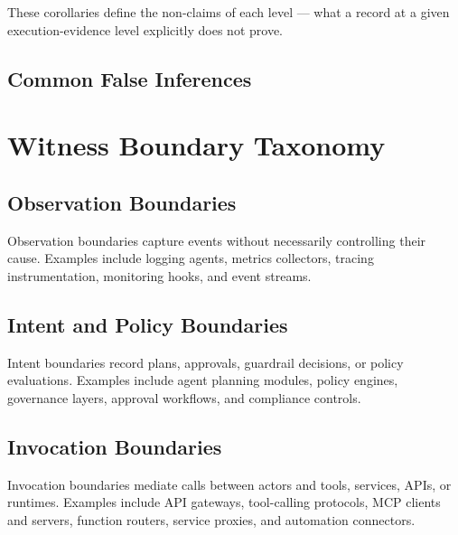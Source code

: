 \documentclass[11pt]{article}
\begin{document}
\medskip
\noindent These corollaries define the non-claims of each level --- what a record at a given execution-evidence level explicitly does not prove.

\subsection{Common False Inferences}

\begingroup
\setlength{\fboxsep}{8pt}
\noindent{}
\endgroup

\section{Witness Boundary Taxonomy}

\subsection{Observation Boundaries}
Observation boundaries capture events without necessarily controlling their cause. Examples include logging agents, metrics collectors, tracing instrumentation, monitoring hooks, and event streams.

\subsection{Intent and Policy Boundaries}
Intent boundaries record plans, approvals, guardrail decisions, or policy evaluations. Examples include agent planning modules, policy engines, governance layers, approval workflows, and compliance controls.

\subsection{Invocation Boundaries}
Invocation boundaries mediate calls between actors and tools, services, APIs, or runtimes. Examples include API gateways, tool-calling protocols, MCP clients and servers, function routers, service proxies, and automation connectors.
\end{document}
